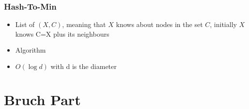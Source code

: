 \documentclass[12pt,oneside]{report}
\begin{document}
\section{Hash-To-Min}
\begin{itemize}
    \item List of \((X, C)\), meaning that \(X\) knows about nodes in the set \(C\), initially \(X\) knows C=X plus its neighbours
    \item Algorithm
    \item \(O(\log d)\) with d is the diameter
\end{itemize}











\part{Bruch Part}
\end{document}
